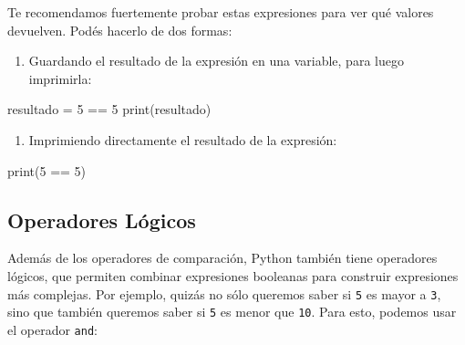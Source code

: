 \documentclass[
  letterpaper,
  DIV=11,
  numbers=noendperiod]{scrreprt}
\newenvironment{Shaded}{\begin{snugshade}}{\end{snugshade}}
\newcommand{\BuiltInTok}[1]{\textcolor[rgb]{0.00,0.23,0.31}{#1}}
\newcommand{\DecValTok}[1]{\textcolor[rgb]{0.68,0.00,0.00}{#1}}
\newcommand{\NormalTok}[1]{\textcolor[rgb]{0.00,0.23,0.31}{#1}}
\newcommand{\OperatorTok}[1]{\textcolor[rgb]{0.37,0.37,0.37}{#1}}
\providecommand{\tightlist}{%
  \setlength{\itemsep}{0pt}\setlength{\parskip}{0pt}}\usepackage{longtable,booktabs,array}
\begin{document}
\begin{tcolorbox}[enhanced jigsaw, arc=.35mm, toptitle=1mm, colframe=quarto-callout-tip-color-frame, bottomtitle=1mm, opacitybacktitle=0.6, colbacktitle=quarto-callout-tip-color!10!white, leftrule=.75mm, coltitle=black, toprule=.15mm, titlerule=0mm, title=\textcolor{quarto-callout-tip-color}{\faLightbulb}\hspace{0.5em}{Tip}, bottomrule=.15mm, rightrule=.15mm, colback=white, breakable, opacityback=0, left=2mm]

Te recomendamos fuertemente probar estas expresiones para ver qué
valores devuelven. Podés hacerlo de dos formas:

\begin{enumerate}
\def\labelenumi{\arabic{enumi}.}
\tightlist
\item
  Guardando el resultado de la expresión en una variable, para luego
  imprimirla:
\end{enumerate}

\begin{Shaded}
\begin{Highlighting}[]
\NormalTok{resultado }\OperatorTok{=} \DecValTok{5} \OperatorTok{==} \DecValTok{5}
\BuiltInTok{print}\NormalTok{(resultado)}
\end{Highlighting}
\end{Shaded}

\begin{enumerate}
\def\labelenumi{\arabic{enumi}.}
\setcounter{enumi}{1}
\tightlist
\item
  Imprimiendo directamente el resultado de la expresión:
\end{enumerate}

\begin{Shaded}
\begin{Highlighting}[]
\BuiltInTok{print}\NormalTok{(}\DecValTok{5} \OperatorTok{==} \DecValTok{5}\NormalTok{)}
\end{Highlighting}
\end{Shaded}

\end{tcolorbox}

\subsection{Operadores Lógicos}\label{operadores-luxf3gicos}

Además de los operadores de comparación, Python también tiene operadores
lógicos, que permiten combinar expresiones booleanas para construir
expresiones más complejas. Por ejemplo, quizás no sólo queremos saber si
\texttt{5} es mayor a \texttt{3}, sino que también queremos saber si
\texttt{5} es menor que \texttt{10}. Para esto, podemos usar el operador
\texttt{and}:
\end{document}
